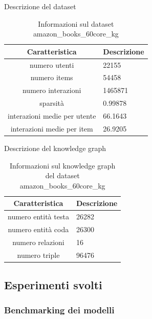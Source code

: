 \noindent Descrizione del dataset
\begin{table}[H]
    \centering
    \footnotesize
    \begin{tabularx}{\textwidth}{|c|X|}
        \hline
        \textbf{Caratteristica} & \textbf{Descrizione} \\
        \hline
        numero utenti & 22155 \\
        \hline
        numero items & 54458 \\
        \hline
        numero interazioni & 1465871 \\
        \hline
        sparsità & 0.99878 \\
        \hline
        interazioni medie per utente & 66.1643\\
        \hline
        interazioni medie per item & 26.9205 \\
        \hline
    \end{tabularx}
    \caption{Informazioni sul dataset amazon\_books\_60core\_kg}
    \label{tab:dataset_info}
\end{table}

\noindent Descrizione del knowledge graph
\begin{table}[H]
    \centering
    \footnotesize
    \begin{tabularx}{\textwidth}{|c|X|}
        \hline
        \textbf{Caratteristica} & \textbf{Descrizione} \\
        \hline
        numero entità testa & 26282 \\
        \hline
        numero entità coda & 26300 \\
        \hline
        numero relazioni & 16 \\
        \hline
        numero triple & 96476 \\
        \hline
    \end{tabularx}
    \caption{Informazioni sul knowledge graph del dataset amazon\_books\_60core\_kg}
    \label{tab:dataset_info}
\end{table}


\subsection{Esperimenti svolti}
\subsubsection{Benchmarking dei modelli}

